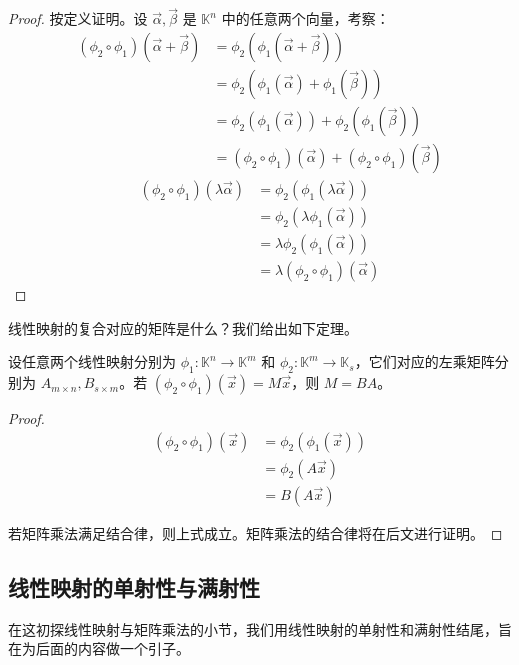 \begin{proof}
	按定义证明。设 $\vec \alpha, \vec \beta$ 是 $\mathbb K^n$ 中的任意两个向量，考察：
	$$
	\begin{aligned}
		(\phi_2 \circ \phi_1) (\vec \alpha + \vec \beta) &= \phi_2(\phi_1(\vec \alpha + \vec \beta))
		\\&=
		\phi_2(\phi_1(\vec \alpha) + \phi_1(\vec \beta))
		\\&=
		\phi_2(\phi_1(\vec \alpha)) + \phi_2(\phi_1(\vec \beta))
		\\&=
		(\phi_2 \circ \phi_1)(\vec \alpha) + (\phi_2 \circ \phi_1)(\vec \beta)
	\end{aligned}
	$$$$
	\begin{aligned}
		(\phi_2 \circ \phi_1)(\lambda \vec \alpha) &= \phi_2(\phi_1(\lambda \vec \alpha))
		\\&=
		\phi_2(\lambda \phi_1(\vec \alpha))
		\\&=
		\lambda \phi_2(\phi_1(\vec \alpha))
		\\&=
		\lambda (\phi_2 \circ \phi_1)(\vec \alpha)
	\end{aligned}
	$$
\end{proof}

线性映射的复合对应的矩阵是什么？我们给出如下定理。

\begin{theorem}
	设任意两个线性映射分别为 $\phi_1 \colon \mathbb K^n \to \mathbb K^m$ 和 $\phi_2 \colon \mathbb K^m \to \mathbb K_s$，它们对应的左乘矩阵分别为 $A_{m \times n}, B_{s \times m}$。若 $(\phi_2 \circ \phi_1)(\vec x) = M \vec x$，则 $M = BA$。
\end{theorem}


\begin{proof}
	$$
	\begin{aligned}
		(\phi_2 \circ \phi_1)(\vec x) &= \phi_2(\phi_1(\vec x))
		\\&=
		\phi_2(A \vec x)
		\\&=
		B(A \vec x)
	\end{aligned}
	$$

	若矩阵乘法满足结合律，则上式成立。矩阵乘法的结合律将在后文进行证明。
\end{proof}

\subsection{线性映射的单射性与满射性}

在这初探线性映射与矩阵乘法的小节，我们用线性映射的单射性和满射性结尾，旨在为后面的内容做一个引子。

